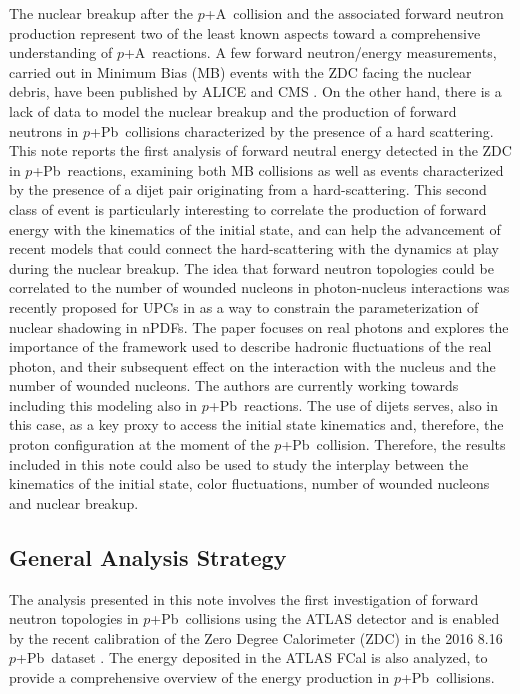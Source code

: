 \documentclass[NOTE, atlasdraft=true, texlive=2020, UKenglish]{atlasdoc}
\newcommand{\pxA}{$p$+A}
\newcommand{\pxPb}{$p$+Pb}
\begin{document}
The nuclear breakup after the \pxA\ collision and the associated forward neutron production represent two of the least known aspects toward a comprehensive understanding of \pxA\ reactions. A few forward neutron/energy measurements, carried out in Minimum Bias (MB) events with the ZDC facing the nuclear debris, have been published by ALICE \cite{ALICE:2021poe} and CMS \cite{Suranyi:2021ssd}. On the other hand, there is a lack of data to model the nuclear breakup and the production of forward neutrons in \pxPb\ collisions characterized by the presence of a hard scattering. This note reports the first analysis of forward neutral energy detected in the ZDC in  \pxPb\ reactions, examining both MB collisions as well as events characterized by the presence of a dijet pair originating from a hard-scattering. This second class of event is particularly interesting to correlate the production of forward energy with the kinematics of the initial state, and can help the advancement of recent models that could connect the hard-scattering with the dynamics at play during the nuclear breakup. 
The idea that forward neutron topologies could be correlated to the number of wounded nucleons in photon-nucleus interactions was recently proposed for UPCs in \cite{Alvioli:2024cmd} as a way to constrain the parameterization of nuclear shadowing in nPDFs. The paper focuses on real photons and explores the importance of the framework used to describe hadronic fluctuations of the real photon, and their subsequent effect on the interaction with the nucleus and the number of wounded nucleons. The authors are currently working towards including this modeling also in \pxPb\ reactions. The use of dijets serves, also in this case, as a key proxy to access the initial state kinematics and, therefore, the proton configuration at the moment of the \pxPb\ collision. 
Therefore, the results included in this note could also be used to study the interplay between the kinematics of the initial state, color fluctuations, number of wounded nucleons and nuclear breakup. 



















\subsection{General Analysis Strategy}
\label{sec:GAS}
The analysis presented in this note involves the first investigation of forward neutron topologies in \pxPb\ collisions using the ATLAS detector and is enabled by the recent calibration of the Zero Degree Calorimeter (ZDC) in the 2016 8.16 \pxPb\ dataset \cite{Hoppesch:2900504}. The energy deposited in the ATLAS FCal is also analyzed, to provide a comprehensive overview of the energy production in \pxPb\ collisions. 
\end{document}
